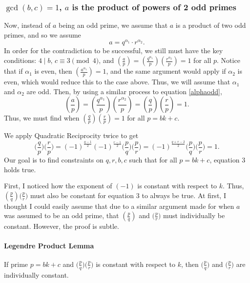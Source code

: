 \documentclass{article}
\newcommand{\al}{\alpha}
\newcommand{\qrB}[2]{\Big( \frac{#1}{#2}\Big)}
\newcommand{\qrbg}[2]{\bigg( \frac{#1}{#2}\bigg)}
\newcommand{\qrn}[2]{\left( \frac{#1}{#2}\right)}
\begin{document}
\subsubsection{$\gcd(b,c)=1$, $a$ is the product of powers of 2 odd primes}
Now, instead of $a$ being an odd prime, we assume that $a$ is a product of two odd primes, and so we assume \[a = q^{\al_1} \cdot r^{\al_2}.\] 
In order for the contradiction to be successful, we still must have the key conditions: $4 \mid b$, $c \equiv 3 \pmod 4$, and $\qrn{a}{p} = \qrn{q^{\al_1}}{p}\qrn{r^{\al_2}}{p} =1$ for all $p$. Notice that if $\al_1$ is even, then $\qrn{a^{\al_1}}{p}=1$, and the same argument would apply if $\al_2$ is even, which would reduce this to the case above. Thus, we will assume that $\al_1$ and $\al_2$ are odd. Then, by using a similar process to equation \ref{alphaodd}, \[\qrn{a}{p}=\qrn{q^{\al_1}}{p}\qrn{r^{\al_2}}{p} = \qrn{q}{p}\qrn{r}{p} = 1.\] Thus, we must find when $\qrn{q}{p}\qrn{r}{p}=1$ for all $p=bk+c$.

We apply Quadratic Reciprocity twice to get
\begin{equation}\label{eq3}\qrbg{q}{p}\qrbg{r}{p} = (-1)^{\frac{q-1}{2}}(-1)^{\frac{r-1}{2}} \qrbg{p}{q} \qrbg{p}{r} = (-1)^{\frac{q+r-2}{2}} \qrbg{p}{q} \qrbg{p}{r} = 1.\end{equation}
Our goal is to find constraints on $q, r, b, c$ such that for all $p=bk+c$, equation 3 holds true.

First, I noticed how the exponent of $(-1)$ is constant with respect to $k$. Thus, $\qrn{p}{q}\qrB{p}{r}$ must also be constant for equation 3 to always be true. At first, I thought I could easily assume that due to a similar argument made for when $a$ was assumed to be an odd prime, that $\qrn{p}{q}$ and $\qrB{p}{r}$ must individually be constant. However, the proof is subtle.

\paragraph{Legendre Product Lemma} If prime $p=bk+c$ and $\qrB{p}{q}\qrB{p}{r}$ is constant with respect to $k$, then $\qrB{p}{q}$ and $\qrB{p}{r}$ are individually constant.
\end{document}
